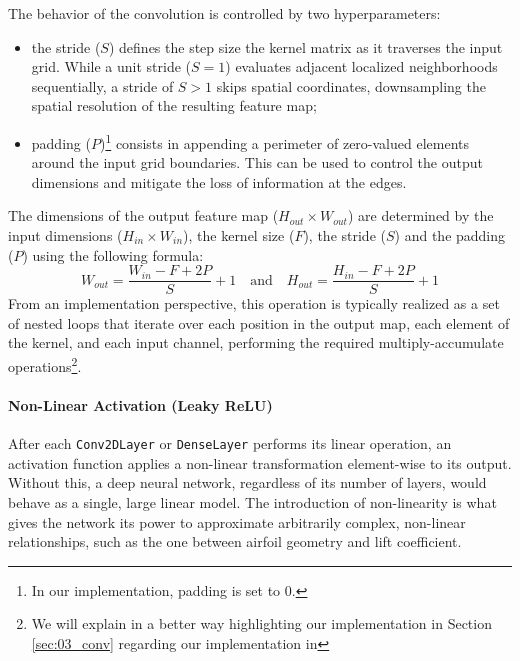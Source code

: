 The behavior of the convolution is controlled by two hyperparameters:\\
\begin{itemize}[itemsep=2ex]
    \item[-] the stride ($S$) defines the step size the kernel matrix as it traverses the input grid. While a unit stride ($S=1$) evaluates adjacent localized neighborhoods sequentially, a stride of $S > 1$ skips spatial coordinates, downsampling the spatial resolution of the resulting feature map;
    \item[-] padding ($P$)\footnote{In our implementation, padding is set to $0$.} consists in appending a perimeter of zero-valued elements around the input grid boundaries. This can be used to control the output dimensions and mitigate the loss of information at the edges.
\end{itemize}
\vspace{2ex}
The dimensions of the output feature map ($H_{out}\times W_{out}$) are determined by the input dimensions ($H_{in}\times W_{in}$), the kernel size ($F$), the stride ($S$) and the padding ($P$) using the following formula:
\begin{equation}
    W_{out}=\frac{W_{in}-F+2P}{S}+1\quad\text{and}\quad H_{out}=\frac{H_{in}-F+2P}{S}+1
    \label{eq:03_convol}
\end{equation}
From an implementation perspective, this operation is typically realized as a set of nested loops that iterate over each position in the output map, each element of the kernel, and each input channel, performing the required multiply-accumulate operations\footnote{We will explain in a better way highlighting our \cpp implementation in Section \ref{sec:03_conv} regarding our implementation in \cpp}.

\paragraph{Non-Linear Activation (Leaky ReLU)}

After each \texttt{Conv2DLayer} or \texttt{DenseLayer} performs its linear operation, an activation function applies a non-linear transformation element-wise to its output. Without this, a deep neural network, regardless of its number of layers, would behave as a single, large linear model. The introduction of non-linearity is what gives the network its power to approximate arbitrarily complex, non-linear relationships, such as the one between airfoil geometry and lift coefficient.\\

